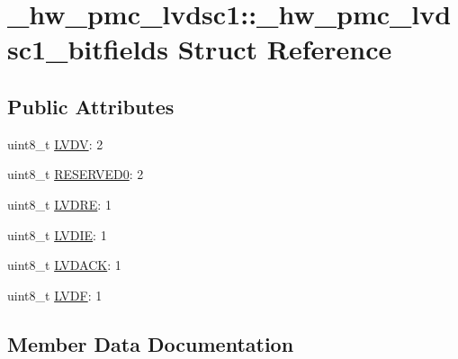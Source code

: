 \hypertarget{struct__hw__pmc__lvdsc1_1_1__hw__pmc__lvdsc1__bitfields}{}\section{\+\_\+hw\+\_\+pmc\+\_\+lvdsc1\+:\+:\+\_\+hw\+\_\+pmc\+\_\+lvdsc1\+\_\+bitfields Struct Reference}
\label{struct__hw__pmc__lvdsc1_1_1__hw__pmc__lvdsc1__bitfields}
\subsection*{Public Attributes}
\begin{DoxyCompactItemize}
\item 
uint8\+\_\+t \hyperlink{struct__hw__pmc__lvdsc1_1_1__hw__pmc__lvdsc1__bitfields_a543b9e46c5aa0efa4a4dcb0f56fa23e1}{L\+V\+DV}\+: 2
\item 
uint8\+\_\+t \hyperlink{struct__hw__pmc__lvdsc1_1_1__hw__pmc__lvdsc1__bitfields_a427c1b1fcb65455a16320fb1994213ae}{R\+E\+S\+E\+R\+V\+E\+D0}\+: 2
\item 
uint8\+\_\+t \hyperlink{struct__hw__pmc__lvdsc1_1_1__hw__pmc__lvdsc1__bitfields_af465f8f9464ef525031bdd0363bc5651}{L\+V\+D\+RE}\+: 1
\item 
uint8\+\_\+t \hyperlink{struct__hw__pmc__lvdsc1_1_1__hw__pmc__lvdsc1__bitfields_a13c0c924dd88799e1aebc49bc57c9bc3}{L\+V\+D\+IE}\+: 1
\item 
uint8\+\_\+t \hyperlink{struct__hw__pmc__lvdsc1_1_1__hw__pmc__lvdsc1__bitfields_a89fa2d33c50ebe29009543b49aa8bccd}{L\+V\+D\+A\+CK}\+: 1
\item 
uint8\+\_\+t \hyperlink{struct__hw__pmc__lvdsc1_1_1__hw__pmc__lvdsc1__bitfields_aa58d935cfcbb11d10ab11faa33d98908}{L\+V\+DF}\+: 1
\end{DoxyCompactItemize}


\subsection{Member Data Documentation}
